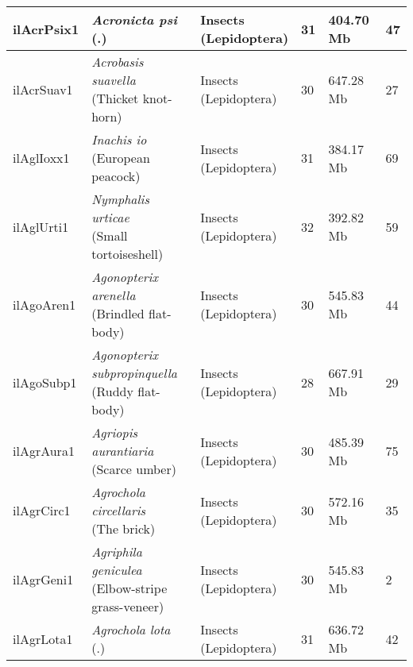 \begin{centering}
\begin{longtable}{l|l|l|l|l|l}
ilAcrPsix1 & \makecell[{l}]{\textit{Acronicta psi} \\ (.)} & \makecell[{l}]{Insects \\ (Lepidoptera)} & 31 & 404.70 Mb & 47  \\ \hline
ilAcrSuav1 & \makecell[{l}]{\textit{Acrobasis suavella} \\ (Thicket knot-horn)} & \makecell[{l}]{Insects \\ (Lepidoptera)} & 30 & 647.28 Mb & 27  \\ \hline
ilAglIoxx1 & \makecell[{l}]{\textit{Inachis io} \\ (European peacock)} & \makecell[{l}]{Insects \\ (Lepidoptera)} & 31 & 384.17 Mb & 69  \\ \hline
ilAglUrti1 & \makecell[{l}]{\textit{Nymphalis urticae} \\ (Small tortoiseshell)} & \makecell[{l}]{Insects \\ (Lepidoptera)} & 32 & 392.82 Mb & 59  \\ \hline
ilAgoAren1 & \makecell[{l}]{\textit{Agonopterix arenella} \\ (Brindled flat-body)} & \makecell[{l}]{Insects \\ (Lepidoptera)} & 30 & 545.83 Mb & 44  \\ \hline
ilAgoSubp1 & \makecell[{l}]{\textit{Agonopterix subpropinquella} \\ (Ruddy flat-body)} & \makecell[{l}]{Insects \\ (Lepidoptera)} & 28 & 667.91 Mb & 29  \\ \hline
ilAgrAura1 & \makecell[{l}]{\textit{Agriopis aurantiaria} \\ (Scarce umber)} & \makecell[{l}]{Insects \\ (Lepidoptera)} & 30 & 485.39 Mb & 75  \\ \hline
ilAgrCirc1 & \makecell[{l}]{\textit{Agrochola circellaris} \\ (The brick)} & \makecell[{l}]{Insects \\ (Lepidoptera)} & 30 & 572.16 Mb & 35  \\ \hline
ilAgrGeni1 & \makecell[{l}]{\textit{Agriphila geniculea} \\ (Elbow-stripe grass-veneer)} & \makecell[{l}]{Insects \\ (Lepidoptera)} & 30 & 545.83 Mb & 2  \\ \hline
ilAgrLota1 & \makecell[{l}]{\textit{Agrochola lota} \\ (.)} & \makecell[{l}]{Insects \\ (Lepidoptera)} & 31 & 636.72 Mb & 42  \\ \hline

\end{longtable}
\end{centering}
